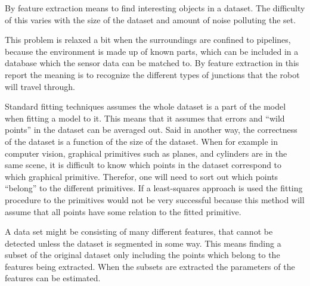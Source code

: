 By feature extraction means to find interesting objects in a dataset. The difficulty of
this varies with the size of the dataset and amount of noise polluting the set.

This problem is relaxed a bit when the surroundings are confined to pipelines, because the
environment is made up of known parts, which can be included in a database which the
sensor data can be matched to. 
By feature extraction in this report the meaning is to recognize the different types of junctions
that the robot will travel through. 

Standard fitting techniques assumes the whole dataset is a part of the model when fitting
a model to it. This
means that it assumes that errors and ``wild points'' in the dataset can be averaged out.
Said in another way, the correctness of the dataset is a function of the size of the
dataset. When for example in computer vision, graphical primitives such as planes, and
cylinders are in the same scene, it is difficult to know which points in the dataset
correspond to which graphical primitive. Therefor, one will need to sort out which points
``belong'' to the different primitives. If a least-squares approach is used the fitting
procedure to the primitives would not be very successful because this method will assume
that all points have some relation to the fitted primitive. \cite{ransac}

A data set might be consisting of many different features, that cannot be detected unless
the dataset is segmented in some way. This means finding a subset of the original dataset
only including the points which belong to the features being extracted. 
When the subsets are extracted the parameters of the features can be estimated. 


